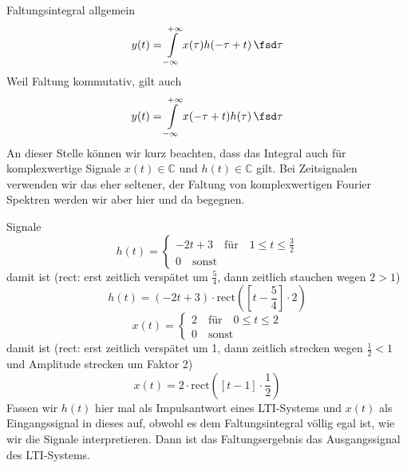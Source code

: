 \begin{Werkzeug}
Faltungsintegral allgemein
\begin{equation}
y(t) = \int\limits_{-\infty}^{+\infty} x(\tau) h(-\tau + t) \, \fsd \tau
\end{equation}
Weil Faltung kommutativ, gilt auch
\begin{equation}
y(t) = \int\limits_{-\infty}^{+\infty} x(-\tau+t) h(\tau) \, \fsd \tau
\end{equation}
An dieser Stelle können wir kurz beachten, dass das Integral auch für
komplexwertige Signale $x(t)\in\mathbb{C}$ und $h(t)\in\mathbb{C}$ gilt. Bei
Zeitsignalen verwenden wir das eher seltener, der Faltung von komplexwertigen
Fourier Spektren werden wir aber hier und da begegnen.
\end{Werkzeug}

\begin{Ansatz}
Signale
\begin{equation}
h(t) =
\begin{cases}
-2 t + 3 \quad \mathrm{für} \quad 1 \leq t \leq \frac{3}{2}\\
0 \quad \mathrm{sonst}
\end{cases}
\end{equation}
damit ist (rect: erst zeitlich verspätet um $\frac{5}{4}$, dann zeitlich
stauchen wegen $2>1$)
\begin{equation}
h(t) = (-2 t + 3) \cdot \mathrm{rect}\left(\left[t-\frac{5}{4}\right] \cdot 2\right)
\end{equation}
\begin{equation}
x(t)=
\begin{cases}
  2 \quad \mathrm{für} \quad 0 \leq t \leq 2\\
  0 \quad \mathrm{sonst}
\end{cases}
\end{equation}
damit ist (rect: erst zeitlich verspätet um 1, dann zeitlich strecken wegen
$\frac{1}{2}<1$ und Amplitude strecken um Faktor 2)
\begin{equation}
x(t) = 2\cdot\mathrm{rect}\left(\left[t-1\right] \cdot \frac{1}{2}\right)
\end{equation}
Fassen wir $h(t)$ hier mal als Impulsantwort eines LTI-Systems und $x(t)$ als
Eingangssignal in dieses auf, obwohl es dem Faltungsintegral völlig egal ist,
wie wir die Signale interpretieren.
%
Dann ist das Faltungsergebnis das Ausgangssignal des LTI-Systems.
\end{Ansatz}


